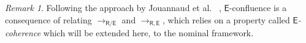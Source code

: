 \documentclass[11pt,a4paper]{amsart}
\newcommand{\daniele}[1]{\textcolor{cyan}{#1}}
\newcommand{\alert}[1]{\textcolor{red}{#1}}
\newcommand{\dani}[1]{\textcolor{orange}{#1}}
\newcommand{\theory}[1]{\ensuremath{\mathsf{#1}}}
\theoremstyle{plain}
\theoremstyle{definition}
\newtheorem{definition}[theorem]{Definition}
\theoremstyle{remark}
\newtheorem{remark}[theorem]{Remark}
\begin{document}
\begin{remark}\label{rmk:e-coherence-prop}
Following the approach by Jouannaud et al. ~\cite{JouannaudKK83:Incremental}, $\theory{E}$-confluence is a consequence of relating $\to_{\theory{R/E}}$ and $\to_{\theory{R,E}}$, which relies on a property called {\em $\theory{E}$-coherence} which will be extended here, to the nominal framework.



 


\end{remark}
\end{document}
